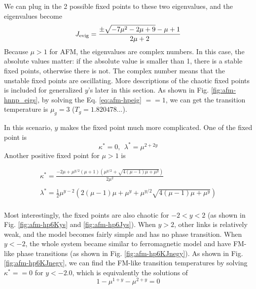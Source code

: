 We can plug in the 2 possible fixed points to these two eigenvalues, and the eigenvalues become
\begin{equation}
J_{\rm evig} = \frac{\pm \sqrt{-7 \mu ^2-2 \mu +9}-\mu +1}{2 \mu +2}
\label{eq:afm-hnnpJevig2}
\end{equation}
Because $\mu>1$ for AFM, the eigenvalues are complex numbers. In this case, the absolute values matter: if the absolute value is smaller than 1, there is a stable fixed points, otherwise there is not. The complex number means that the unstable fixed points are oscillating. More descriptions of the chaotic fixed points is included for generalized $y$'s later in this section. As shown in Fig. \ref{fig:afm-hnnp_eigs}, by solving the Eq. \ref{eq:afm-hpeig} $ ==1$, we can get the transition temperature is $\mu_g=3$ ($T_g=1.820478...$).


In this scenario, $y$ makes the fixed point much more complicated. One of the fixed point is
\begin{equation}
\kappa^* = 0, \ \ \lambda^* = \mu^{2+2y} 
\end{equation} 
Another positive fixed point for $\mu>1$ is 

\begin{equation}
\begin{array}{l}
\kappa^*=\frac{-2 \mu +\mu^{y/2}(\mu + 1) \left( \mu^{y/2}+\sqrt{4 (\mu -1) \mu +\mu ^y}\right) } {2 \mu ^2}  \\ \\
\lambda^* = \frac{1}{2} \mu ^{y-2} \left(2 (\mu -1) \mu +\mu ^y+\mu ^{y/2}\sqrt{4 (\mu -1) \mu +\mu ^y} \right) \\
\end{array}
\end{equation} 

Most interestingly, the fixed points are also chaotic for $-2<y<2$ (as shown in Fig. \ref{fig:afm-hp6Kys} and \ref{fig:afm-hp6Jys}).  When $y>2$, other links is relatively weak, and the model becomes fairly simple and has no phase transition. When $y<-2$, the whole system became similar to ferromagnetic model and have FM-like phase transitions (as shown in Fig. \ref{fig:afm-hp6KJnegy}). As shown in Fig. \ref{fig:afm-hp6KJnegy}, we can find the FM-like transition temperatures by solving $\kappa^*==0$  for $y<-2.0$, which is equivalently the solutions of 
\begin{equation}
1 - \mu^{1 + y} - \mu^{2 + y} = 0 
\end{equation}


